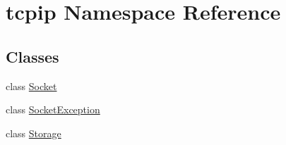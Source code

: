 \hypertarget{namespacetcpip}{}\section{tcpip Namespace Reference}
\label{namespacetcpip}
\subsection*{Classes}
\begin{DoxyCompactItemize}
\item 
class \hyperlink{classtcpip_1_1_socket}{Socket}
\item 
class \hyperlink{classtcpip_1_1_socket_exception}{Socket\+Exception}
\item 
class \hyperlink{classtcpip_1_1_storage}{Storage}
\end{DoxyCompactItemize}
